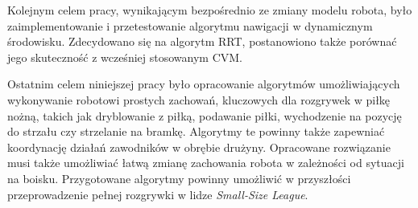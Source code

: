Kolejnym celem pracy, wynikającym bezpośrednio ze zmiany modelu robota, było zaimplementowanie i przetestowanie algorytmu nawigacji w dynamicznym środowisku. Zdecydowano się na algorytm RRT,
postanowiono także porównać jego skuteczność z wcześniej stosowanym CVM.

Ostatnim celem niniejszej pracy było opracowanie algorytmów umożliwiających wykonywanie robotowi prostych zachowań, kluczowych dla rozgrywek w piłkę nożną, takich jak dryblowanie z piłką,
podawanie piłki, wychodzenie na pozycję do strzału czy strzelanie na bramkę. Algorytmy te powinny także zapewniać koordynację działań zawodników w obrębie drużyny.
Opracowane rozwiązanie musi także umożliwiać łatwą zmianę zachowania robota w zależności od sytuacji na boisku.
Przygotowane algorytmy powinny umożliwić w przyszłości przeprowadzenie pełnej rozgrywki w lidze  \emph{Small-Size League}.

